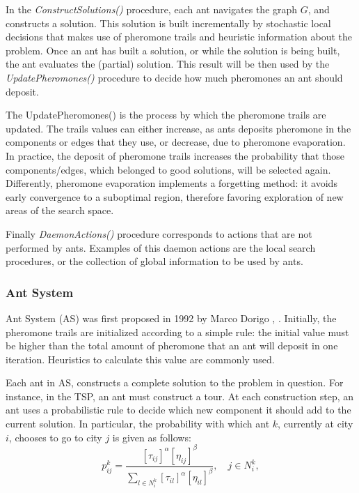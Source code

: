 				In the \emph{ConstructSolutions()} procedure, each ant navigates the graph $G$, and constructs a solution. This solution is built incrementally by stochastic local decisions that makes use of pheromone trails and heuristic information about the problem. Once an ant has built a solution, or while the solution is being built, the ant evaluates the (partial) solution. This result will be then used by the \emph{UpdatePheromones()} procedure to decide how much pheromones an ant should deposit.
				
				The UpdatePheromones() is the process by which the pheromone trails are updated. The trails values can either increase, as ants deposits pheromone in the components or edges that they use, or decrease, due to pheromone evaporation. In practice, the deposit of pheromone trails increases the probability that those components/edges, which belonged to good solutions, will be selected again. Differently, pheromone evaporation implements a forgetting method: it avoids early convergence to a suboptimal region, therefore favoring exploration of new areas of the search space.
				 
				Finally \emph{DaemonActions()} procedure corresponds to actions that are not performed by ants. Examples of this daemon actions are the local search procedures, or the collection of global information to be used by ants.

					\subsubsection*{Ant System} 
					\label{sec:ant_system}
					Ant System (AS) was first proposed in 1992 by Marco Dorigo \cite{dorigo92}, \cite{dorigo96}.
					Initially, the pheromone trails are initialized according to a simple rule: the initial value must be higher than the total amount of pheromone that an ant will deposit in one iteration. Heuristics to calculate this value are commonly used.

					Each ant in AS, constructs a complete solution to the problem in question. For instance, in the TSP, an ant must construct a tour. At each construction step, an ant uses a probabilistic rule to decide which new component it should add to the current solution. In particular, the probability with which ant $k$, currently at city $i$, chooses to go to city $j$ is given as follows:
					\begin{equation}
						\label{eq:prob_rule_for_choice}
						p_{ij}^k = \frac{[\tau_{ij}]^\alpha[\eta_{ij}]^\beta} {\sum_{l \in N_{i}^k} [\tau_{il}]^\alpha[\eta_{il}]^\beta}, \quad j \in N_{i}^k,
					\end{equation}

